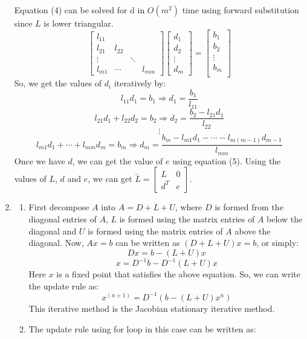 \documentclass{article}
\begin{document}
\begin{enumerate}
\begin{equation}
    \end{equation}
    Equation (4) can be solved for d in $O(m^2)$ time using forward substitution since $L$ is lower triangular.
    $$\begin{bmatrix}
        l_{11} & & & \\
        l_{21} & l_{22} & & \\
        \vdots & & \ddots & \\
        l_{m1} & \cdots & & l_{mm}
    \end{bmatrix}\begin{bmatrix}
        d_1\\
        d_2\\
        \vdots \\
        d_m
    \end{bmatrix} = \begin{bmatrix}
        b_1\\
        b_2\\
        \vdots \\
        b_m\\
    \end{bmatrix}$$
    So, we get the values of $d_i$ iteratively by:
    $$l_{11}d_1 = b_1 \Rightarrow d_1 = \frac{b_1}{l_{11}}$$
    $$l_{21}d_1 + l_{22}d_2 = b_2 \Rightarrow d_2 = \frac{b_2 - l_{21}d_1}{l_{22}}$$
    $$\vdots$$
    $$l_{m1}d_1 + \cdots + l_{mm}d_m = b_m \Rightarrow d_m = \frac{b_m - l_{m1}d_1 - \cdots - l_{m(m - 1)}d_{m - 1}}{l_{mm}}$$
    Once we have $d$, we can get the value of $e$ using equation (5). Using the values of $L$, $d$ and $e$, we can get $\tilde{L} = \begin{bmatrix}
        L & 0\\
        d^T & e
    \end{bmatrix}$.
    \clearpage
    \item 
    \begin{enumerate}[label=(\alph*)]
    \item First decompose $A$ into $A = D + L + U$, where $D$ is formed from the diagonal entries of $A$, $L$ is formed using the matrix entries of $A$ below the diagonal and $U$ is formed using the matrix entries of $A$ above the diagonal.
    Now, $Ax = b$ can be written as $(D + L + U)x = b$, or simply:
    $$Dx = b - (L + U)x$$
    $$x = D^{-1}b - D^{-1}(L + U)x$$
    Here $x$ is a fixed point that satisfies the above equation. So, we can write the update rule as:
    $$x^{(n + 1)} = D^{-1}(b - (L + U)x^n)$$
    This iterative method is the Jacobian stationary iterative method.
    \item The update rule using for loop in this case can be written as:

\end{enumerate}
\end{enumerate}
\end{document}
